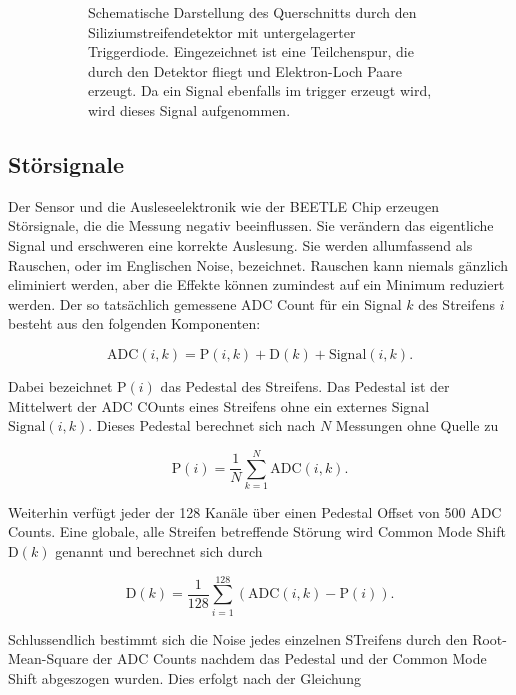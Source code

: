 \begin{figure}[H]
\begin{subfigure}{0.45\textwidth}
    \caption{Schematische Darstellung des Querschnitts durch den Siliziumstreifendetektor mit untergelagerter Triggerdiode. Eingezeichnet ist eine Teilchenspur, die durch den Detektor fliegt und Elektron-Loch Paare erzeugt. Da ein Signal ebenfalls im trigger erzeugt wird, wird dieses Signal aufgenommen.}
    \label{fig:trigger}
  \end{subfigure}%
  \caption{}
\end{figure}

\subsection{Störsignale}

Der Sensor und die Ausleseelektronik wie der BEETLE Chip erzeugen Störsignale, die die Messung negativ beeinflussen.
Sie verändern das eigentliche Signal und erschweren eine korrekte Auslesung.
Sie werden allumfassend als Rauschen, oder im Englischen Noise, bezeichnet.
Rauschen kann niemals gänzlich eliminiert werden, aber die Effekte können zumindest auf ein Minimum reduziert werden.
Der so tatsächlich gemessene ADC Count für ein Signal $k$ des Streifens $i$ besteht aus den folgenden Komponenten:

\begin{equation}
  \label{eqn:ADC}
  \mathup{ADC}(i,k) = \mathup{P}(i,k) + \mathup{D}(k) + \mathup{Signal}(i,k).
\end{equation}

Dabei bezeichnet $\mathup{P}(i)$ das Pedestal des Streifens.
Das Pedestal ist der Mittelwert der ADC COunts eines Streifens ohne ein externes Signal $\mathup{Signal}(i,k)$.
Dieses Pedestal berechnet sich nach $N$ Messungen ohne Quelle zu

\begin{equation}
  \label{eqn:pedestal}
  \mathup{P}(i) = \frac{1}{N} \sum^N_{k=1} \mathup{ADC}(i,k).
\end{equation}

Weiterhin verfügt jeder der 128 Kanäle über einen Pedestal Offset von 500 ADC Counts.
Eine globale, alle Streifen betreffende Störung wird Common Mode Shift $\mathup{D}(k)$ genannt und berechnet sich durch

\begin{equation}
  \label{eqn:shift}
  \mathup{D}(k) = \frac{1}{128} \sum^{128}_{i=1} (\mathup{ADC}(i,k) - \mathup{P}(i)).
\end{equation}

Schlussendlich bestimmt sich die Noise jedes einzelnen STreifens durch den Root-Mean-Square der ADC Counts nachdem das Pedestal und der Common Mode Shift abgeszogen wurden.
Dies erfolgt nach der Gleichung

